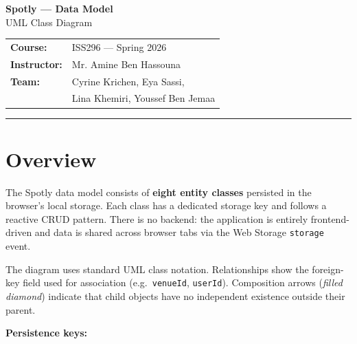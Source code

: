 \documentclass[12pt,a4paper]{article}
\begin{document}
\begin{center}
    {\LARGE\bfseries Spotly --- Data Model}\\[0.4em]
    {\large UML Class Diagram}\\[0.8em]
    \begin{tabular}{ll}
        \textbf{Course:}      & ISS296 --- Spring 2026 \\
        \textbf{Instructor:}  & Mr. Amine Ben Hassouna \\
        \textbf{Team:}        & Cyrine Krichen, Eya Sassi, \\
                              & Lina Khemiri, Youssef Ben Jemaa \\
    \end{tabular}
\end{center}

\vspace{0.6em}
\hrule
\vspace{0.8em}

\section{Overview}

The Spotly data model consists of \textbf{eight entity classes} persisted in
the browser's local storage. Each class has a dedicated storage key and
follows a reactive CRUD pattern. There is no backend: the application is
entirely frontend-driven and data is shared across browser tabs via the
Web Storage \texttt{storage} event.

The diagram uses standard UML class notation. Relationships show the
foreign-key field used for association (e.g.\ \texttt{venueId},
\texttt{userId}). Composition arrows (\emph{filled diamond}) indicate that
child objects have no independent existence outside their parent.

\vspace{0.5em}
\textbf{Persistence keys:}
\end{document}

